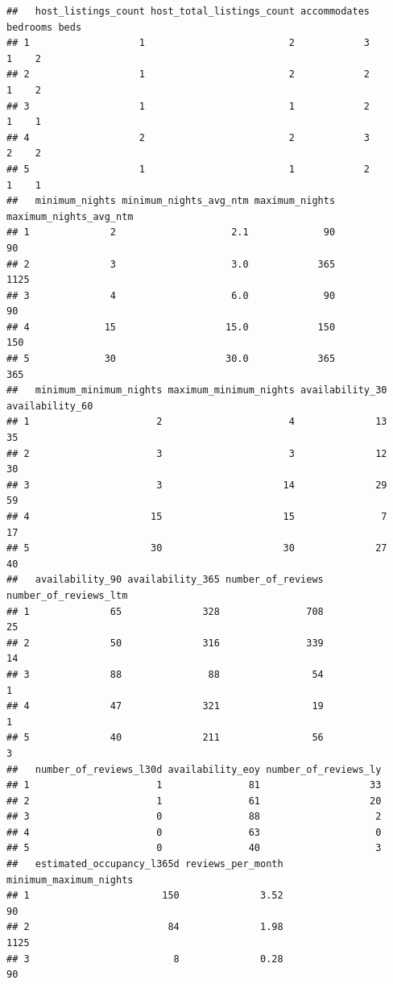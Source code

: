 \documentclass[
]{article}
\begin{document}
\begin{verbatim}
##   host_listings_count host_total_listings_count accommodates bedrooms beds
## 1                   1                         2            3        1    2
## 2                   1                         2            2        1    2
## 3                   1                         1            2        1    1
## 4                   2                         2            3        2    2
## 5                   1                         1            2        1    1
##   minimum_nights minimum_nights_avg_ntm maximum_nights maximum_nights_avg_ntm
## 1              2                    2.1             90                     90
## 2              3                    3.0            365                   1125
## 3              4                    6.0             90                     90
## 4             15                   15.0            150                    150
## 5             30                   30.0            365                    365
##   minimum_minimum_nights maximum_minimum_nights availability_30 availability_60
## 1                      2                      4              13              35
## 2                      3                      3              12              30
## 3                      3                     14              29              59
## 4                     15                     15               7              17
## 5                     30                     30              27              40
##   availability_90 availability_365 number_of_reviews number_of_reviews_ltm
## 1              65              328               708                    25
## 2              50              316               339                    14
## 3              88               88                54                     1
## 4              47              321                19                     1
## 5              40              211                56                     3
##   number_of_reviews_l30d availability_eoy number_of_reviews_ly
## 1                      1               81                   33
## 2                      1               61                   20
## 3                      0               88                    2
## 4                      0               63                    0
## 5                      0               40                    3
##   estimated_occupancy_l365d reviews_per_month minimum_maximum_nights
## 1                       150              3.52                     90
## 2                        84              1.98                   1125
## 3                         8              0.28                     90

\end{verbatim}
\end{document}
